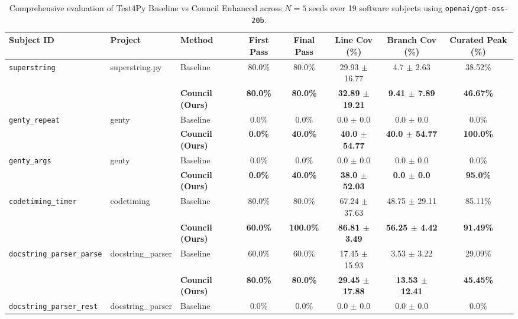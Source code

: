 \begin{table}[t]
\centering
\small
\caption{Comprehensive evaluation of Test4Py Baseline vs Council Enhanced across $N=5$ seeds over 19 software subjects using \texttt{openai/gpt-oss-20b}.}
\label{tab:comprehensive_19_eval}
\begin{tabular}{lll c c c c c}
\toprule
\textbf{Subject ID} & \textbf{Project} & \textbf{Method} & \textbf{First Pass} & \textbf{Final Pass} & \textbf{Line Cov (\%)} & \textbf{Branch Cov (\%)} & \textbf{Curated Peak (\%)} \\
\midrule
\multirow{2}{*}{\texttt{superstring}} & \multirow{2}{*}{superstring.py} & Baseline & 80.0\% & 80.0\% & 29.93 $\pm$ 16.77 & 4.7 $\pm$ 2.63 & 38.52\% \\
 & & \textbf{Council (Ours)} & \textbf{80.0\%} & \textbf{80.0\%} & \textbf{32.89 $\pm$ 19.21} & \textbf{9.41 $\pm$ 7.89} & \textbf{46.67\%} \\
\midrule
\multirow{2}{*}{\texttt{genty_repeat}} & \multirow{2}{*}{genty} & Baseline & 0.0\% & 0.0\% & 0.0 $\pm$ 0.0 & 0.0 $\pm$ 0.0 & 0.0\% \\
 & & \textbf{Council (Ours)} & \textbf{0.0\%} & \textbf{40.0\%} & \textbf{40.0 $\pm$ 54.77} & \textbf{40.0 $\pm$ 54.77} & \textbf{100.0\%} \\
\midrule
\multirow{2}{*}{\texttt{genty_args}} & \multirow{2}{*}{genty} & Baseline & 0.0\% & 0.0\% & 0.0 $\pm$ 0.0 & 0.0 $\pm$ 0.0 & 0.0\% \\
 & & \textbf{Council (Ours)} & \textbf{0.0\%} & \textbf{40.0\%} & \textbf{38.0 $\pm$ 52.03} & \textbf{0.0 $\pm$ 0.0} & \textbf{95.0\%} \\
\midrule
\multirow{2}{*}{\texttt{codetiming_timer}} & \multirow{2}{*}{codetiming} & Baseline & 80.0\% & 80.0\% & 67.24 $\pm$ 37.63 & 48.75 $\pm$ 29.11 & 85.11\% \\
 & & \textbf{Council (Ours)} & \textbf{60.0\%} & \textbf{100.0\%} & \textbf{86.81 $\pm$ 3.49} & \textbf{56.25 $\pm$ 4.42} & \textbf{91.49\%} \\
\midrule
\multirow{2}{*}{\texttt{docstring_parser_parse}} & \multirow{2}{*}{docstring_parser} & Baseline & 60.0\% & 60.0\% & 17.45 $\pm$ 15.93 & 3.53 $\pm$ 3.22 & 29.09\% \\
 & & \textbf{Council (Ours)} & \textbf{80.0\%} & \textbf{80.0\%} & \textbf{29.45 $\pm$ 17.88} & \textbf{13.53 $\pm$ 12.41} & \textbf{45.45\%} \\
\midrule
\multirow{2}{*}{\texttt{docstring_parser_rest}} & \multirow{2}{*}{docstring_parser} & Baseline & 0.0\% & 0.0\% & 0.0 $\pm$ 0.0 & 0.0 $\pm$ 0.0 & 0.0\% \\

\end{tabular}
\end{table}
